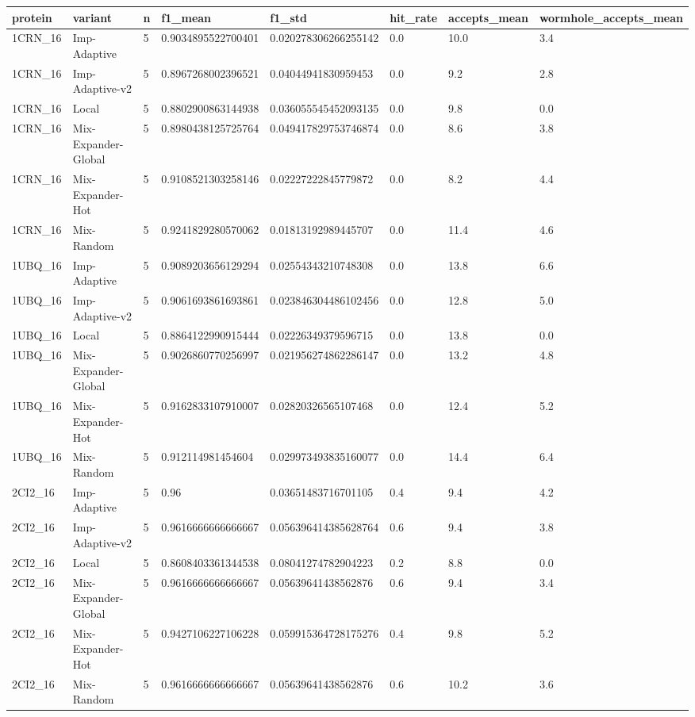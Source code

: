 \begin{tabular}{llllllll}
\toprule
protein & variant & n & f1\_mean & f1\_std & hit\_rate & accepts\_mean & wormhole\_accepts\_mean \\
\midrule
1CRN\_16 & Imp-Adaptive & 5 & 0.9034895522700401 & 0.020278306266255142 & 0.0 & 10.0 & 3.4 \\
1CRN\_16 & Imp-Adaptive-v2 & 5 & 0.8967268002396521 & 0.04044941830959453 & 0.0 & 9.2 & 2.8 \\
1CRN\_16 & Local & 5 & 0.8802900863144938 & 0.036055545452093135 & 0.0 & 9.8 & 0.0 \\
1CRN\_16 & Mix-Expander-Global & 5 & 0.8980438125725764 & 0.049417829753746874 & 0.0 & 8.6 & 3.8 \\
1CRN\_16 & Mix-Expander-Hot & 5 & 0.9108521303258146 & 0.02227222845779872 & 0.0 & 8.2 & 4.4 \\
1CRN\_16 & Mix-Random & 5 & 0.9241829280570062 & 0.01813192989445707 & 0.0 & 11.4 & 4.6 \\
1UBQ\_16 & Imp-Adaptive & 5 & 0.9089203656129294 & 0.02554343210748308 & 0.0 & 13.8 & 6.6 \\
1UBQ\_16 & Imp-Adaptive-v2 & 5 & 0.9061693861693861 & 0.023846304486102456 & 0.0 & 12.8 & 5.0 \\
1UBQ\_16 & Local & 5 & 0.8864122990915444 & 0.02226349379596715 & 0.0 & 13.8 & 0.0 \\
1UBQ\_16 & Mix-Expander-Global & 5 & 0.9026860770256997 & 0.021956274862286147 & 0.0 & 13.2 & 4.8 \\
1UBQ\_16 & Mix-Expander-Hot & 5 & 0.9162833107910007 & 0.02820326565107468 & 0.0 & 12.4 & 5.2 \\
1UBQ\_16 & Mix-Random & 5 & 0.912114981454604 & 0.029973493835160077 & 0.0 & 14.4 & 6.4 \\
2CI2\_16 & Imp-Adaptive & 5 & 0.96 & 0.03651483716701105 & 0.4 & 9.4 & 4.2 \\
2CI2\_16 & Imp-Adaptive-v2 & 5 & 0.9616666666666667 & 0.056396414385628764 & 0.6 & 9.4 & 3.8 \\
2CI2\_16 & Local & 5 & 0.8608403361344538 & 0.08041274782904223 & 0.2 & 8.8 & 0.0 \\
2CI2\_16 & Mix-Expander-Global & 5 & 0.9616666666666667 & 0.05639641438562876 & 0.6 & 9.4 & 3.4 \\
2CI2\_16 & Mix-Expander-Hot & 5 & 0.9427106227106228 & 0.059915364728175276 & 0.4 & 9.8 & 5.2 \\
2CI2\_16 & Mix-Random & 5 & 0.9616666666666667 & 0.05639641438562876 & 0.6 & 10.2 & 3.6 \\

\end{tabular}
